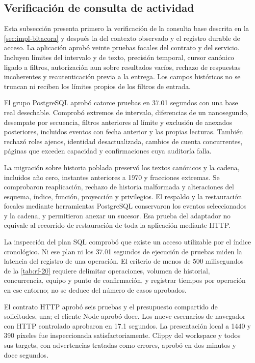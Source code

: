 \subsection{Verificación de consulta de actividad}\label{sec:pruebas-bitacora}
Esta subsección presenta primero la verificación de la consulta base descrita en
la \cref{sec:impl-bitacora} y después la del contexto observado y el registro
durable de acceso. La aplicación aprobó veinte pruebas focales del contrato y del
servicio. Incluyen límites del intervalo y de texto, precisión temporal, cursor canónico ligado a
filtros, autorización aun sobre resultados vacíos, rechazo de respuestas
incoherentes y reautenticación previa a la entrega. Los campos históricos no
se truncan ni reciben los límites propios de los filtros de entrada.

El grupo PostgreSQL aprobó catorce pruebas en 37.01 segundos con una base
real desechable. Comprobó extremos de intervalo, diferencias de un nanosegundo,
desempate por secuencia, filtros anteriores al límite y exclusión de anexados
posteriores, incluidos eventos con fecha anterior y las propias lecturas.
También rechazó roles ajenos, identidad desactualizada, cambios de cuenta
concurrentes, páginas que exceden capacidad y confirmaciones cuya auditoría falla.

La migración sobre historia poblada preservó los textos canónicos y la cadena,
incluidos año cero, instantes anteriores a 1970 y fracciones extremas. Se
comprobaron reaplicación, rechazo de historia malformada y alteraciones del
esquema, índice, función, proyección y privilegios. El respaldo y la restauración
focales mediante herramientas PostgreSQL conservaron los eventos seleccionados
y la cadena, y permitieron anexar un sucesor. Esa prueba del adaptador no equivale
al recorrido de restauración de toda la aplicación mediante HTTP.

La inspección del plan SQL comprobó que existe un acceso utilizable por el
índice cronológico. Ni ese plan ni los 37.01 segundos de ejecución de pruebas
miden la latencia del registro de una operación. El criterio de menos de
500 milisegundos de la \cref{tab:rf-20} requiere delimitar operaciones, volumen
de historial, concurrencia, equipo y punto de confirmación, y registrar tiempos
por operación en ese entorno; no se deduce del número de casos aprobados.

El contrato HTTP aprobó seis pruebas y el presupuesto compartido de solicitudes,
una; el cliente Node aprobó doce. Los nueve escenarios de navegador con HTTP
controlado aprobaron en 17.1 segundos. La presentación local a 1440 y 390 píxeles
fue inspeccionada satisfactoriamente. Clippy del workspace y todos sus targets,
con advertencias tratadas como errores, aprobó en dos minutos y doce segundos.

